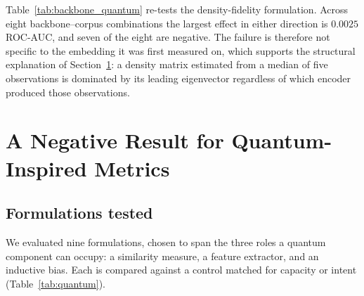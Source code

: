 \documentclass[journal,12pt]{IEEEtran}
\begin{document}
Table~\ref{tab:backbone_quantum} re-tests the density-fidelity formulation.
Across eight backbone--corpus combinations the largest effect in either
direction is $0.0025$ ROC-AUC, and seven of the eight are negative. The failure
is therefore not specific to the embedding it was first measured on, which
supports the structural explanation of Section~\ref{sec:quantum}: a density matrix
estimated from a median of five observations is dominated by its leading
eigenvector regardless of which encoder produced those observations.

\section{A Negative Result for Quantum-Inspired Metrics}
\label{sec:quantum}

\subsection{Formulations tested}

We evaluated nine formulations, chosen to span the three roles a quantum
component can occupy: a similarity measure, a feature extractor, and an
inductive bias. Each is compared against a control matched for capacity or
intent (Table~\ref{tab:quantum}).

\begin{table}[t]
\caption{Quantum-inspired formulations against matched classical controls.}
\label{tab:quantum}
\centering
{}
\end{table}
\end{document}
